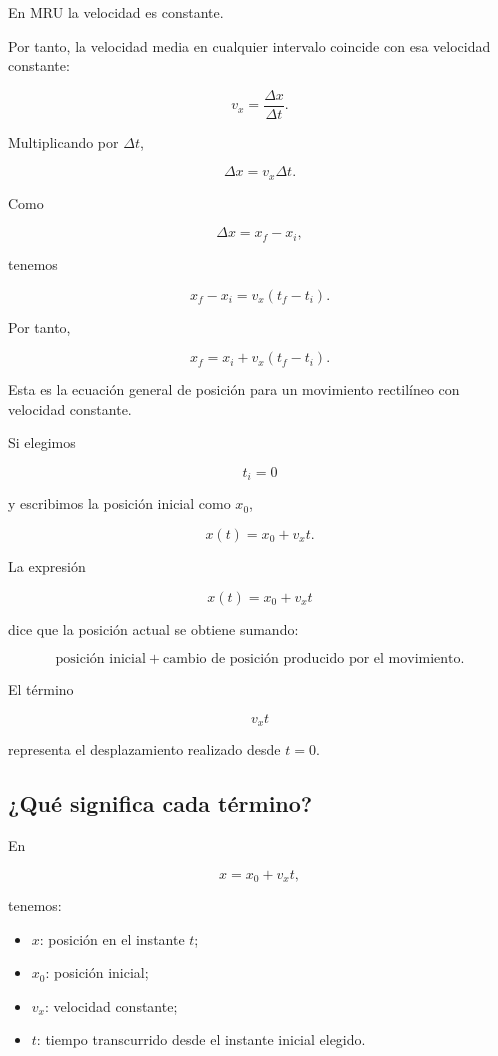 En MRU la velocidad es constante.

Por tanto, la velocidad media en cualquier intervalo coincide con esa
velocidad constante:

\[ v_x=\frac{\Delta x}{\Delta t}. \]

Multiplicando por \(\Delta t\),

\[ \Delta x=v_x\Delta t. \]

Como

\[ \Delta x=x_f-x_i, \]

tenemos

\[ x_f-x_i=v_x(t_f-t_i). \]

Por tanto,

\[ \boxed{x_f=x_i+v_x(t_f-t_i)}. \]

Esta es la ecuación general de posición para un movimiento rectilíneo con
velocidad constante.

Si elegimos

\[ t_i=0 \]

y escribimos la posición inicial como \(x_0\),

\[ \boxed{x(t)=x_0+v_xt}. \]

\begin{interpretacion}
La expresión

\[ x(t)=x_0+v_xt \]

dice que la posición actual se obtiene sumando:

\[
\text{posición inicial}
+
\text{cambio de posición producido por el movimiento}.
\]

El término

\[ v_xt \]

representa el desplazamiento realizado desde \(t=0\).
\end{interpretacion}


\subsection{¿Qué significa cada término?}

En

\[ x=x_0+v_xt, \]

tenemos:

\begin{itemize}
    \item \(x\): posición en el instante \(t\);
    \item \(x_0\): posición inicial;
    \item \(v_x\): velocidad constante;
    \item \(t\): tiempo transcurrido desde el instante inicial elegido.
\end{itemize}

